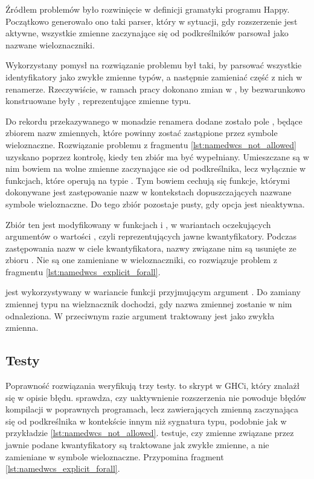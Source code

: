 Źródłem problemów było rozwinięcie  w definicji gramatyki programu
Happy. Początkowo generowało ono taki parser, który w sytuacji, gdy rozszerzenie
 jest aktywne, wszystkie zmienne zaczynające się od
podkreślników parsował jako nazwane wieloznaczniki.

Wykorzystany pomysł na rozwiązanie problemu był taki, by parsować wszystkie
identyfikatory jako zwykłe zmienne typów, a następnie zamieniać część z nich w
renamerze. Rzeczywiście, w ramach pracy dokonano zmian w , by
bezwarunkowo konstruowane były , reprezentujące zmienne typu.

Do rekordu  przekazywanego w monadzie renamera dodane zostało
pole , będące zbiorem nazw zmiennych, które powinny
zostać zastąpione przez symbole wieloznaczne. Rozwiązanie problemu z fragmentu
\ref{lst:namedwcs_not_allowed} uzyskano poprzez kontrolę, kiedy ten zbiór ma być
wypełniany. Umieszczane są w nim bowiem na wolne zmienne zaczynające sie od
podkreślnika, lecz wyłącznie w funkcjach, które operują na typie
. Tym bowiem cechują się funkcje, którymi dokonywane jest
zastępowanie nazw w kontekstach dopuszczających nazwane symbole wieloznaczne. Do
tego zbiór pozostaje pusty, gdy opcja  jest nieaktywna.

Zbiór ten jest modyfikowany w funkcjach  i , w
wariantach oczekujących argumentów o wartości , czyli
reprezentujących jawne kwantyfikatory. Podczas zastępowania nazw w ciele
kwantyfikatora, nazwy związane nim są usunięte ze zbioru . Nie są one zamieniane w wieloznaczniki, co rozwiązuje problem z
fragmentu \ref{lst:namedwcs_explicit_forall}.

 jest wykorzystywany w wariancie funkcji
 przyjmującym argument . Do zamiany zmiennej typu
na wielznacznik dochodzi, gdy nazwa zmiennej zostanie w nim odnaleziona. W
przeciwnym razie argument traktowany jest jako zwykła zmienna.

\subsection{Testy} %

Poprawność rozwiązania weryfikują trzy testy.  to skrypt w GHCi,
który znalażł się w opisie błędu.  sprawdza, czy
uaktywnienie rozszerzenia  nie powoduje błędów kompilacji w
poprawnych programach, lecz zawierających zmienną zaczynająca się od
podkreślnika w kontekście innym niż sygnatura typu, podobnie jak w przykładzie
\ref{lst:namedwcs_not_allowed}.  testuje, czy
zmienne związane przez jawnie podane kwantyfikatory są traktowane jak zwykłe
zmienne, a nie zamieniane w symbole wieloznaczne. Przypomina fragment
\ref{lst:namedwcs_explicit_forall}.
